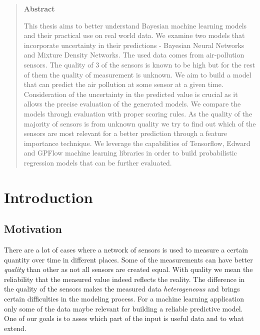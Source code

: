 \documentclass[12pt,a4paper,twoside]{scrartcl}
\numberwithin{equation}{section}
\begin{document}
\begin{abstract}
  \centerline{\bf Abstract}
  This thesis aims to better understand Bayesian machine learning models and their practical use on real world data. We examine two models that incorporate uncertainty in their predictions - Bayesian Neural Networks and Mixture Density Networks. The used data comes from air-pollution sensors. The quality of 3 of the sensors is known to be high but for the rest of them the quality of measurement is unknown. We aim to build a model that can predict the air pollution at some sensor at a given time. Consideration of the uncertainty in the predicted value is crucial as it allows the precise evaluation of the generated models. We compare the models through evaluation with proper scoring rules. As the quality of the majority of sensors is from unknown quality we try to find out which of the sensors are most relevant for a better prediction through a feature importance technique. We leverage the capabilities of Tensorflow, Edward and GPFlow machine learning libraries in order to build probabilistic regression models that can be further evaluated.
\end{abstract}

\vfill\vfill\vfill
\clearpage

\pagestyle{plain}

\renewcommand\sectionmark[1]{\markboth{\thesection\quad\MakeUppercase{#1}}{\thesection\quad\MakeUppercase{#1}}}
\renewcommand\subsectionmark[1]{\markright{\thesubsection\quad\MakeUppercase{#1}}}

\tableofcontents
\clearpage
\listoffigures
\clearpage



\pagestyle{normal}

\section{Introduction}
\label{sec:intoduction}
\subsection{Motivation}
\label{sec:motivation}

There are a lot of cases where a network of sensors is used to measure a certain quantity over time in different places. Some of the measurements can have better \emph{quality} than other as not all sensors are created equal. With quality we mean the reliability that the measured value indeed reflects the reality. The difference in the quality of the sensors  makes the measured data \emph{heterogeneous} and brings certain difficulties in the modeling process. For a machine learning application only some of the data maybe relevant for building a reliable predictive model. One of our goals is to asses which part of the input is useful data and to what extend.
\end{document}
